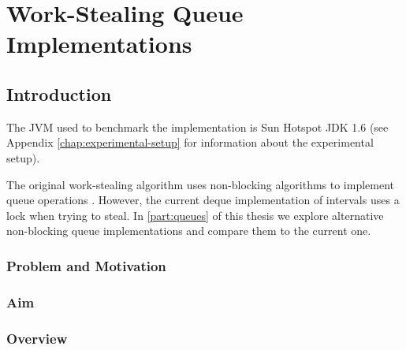 
\part{Work-Stealing Queue Implementations}
\label{part:queues}

\chapter{Introduction}
\label{chap:queues-introduction}

The JVM used to benchmark the implementation is Sun Hotspot JDK 1.6
(see Appendix \ref{chap:experimental-setup} for information about the
experimental setup).

The original work-stealing algorithm uses non-blocking algorithms to
implement queue operations \cite{Arora2001}. However, the current
deque implementation of intervals uses a lock when trying to steal. In
\autoref{part:queues} of this thesis we explore alternative
non-blocking queue implementations and compare them to the current
one.

\section{Problem and Motivation}
\label{sec:queues-intro-problem-and-motivation}


\section{Aim}
\label{sec:queues-intro-aim}


\section{Overview}
\label{sec:queues-intro-overview}


